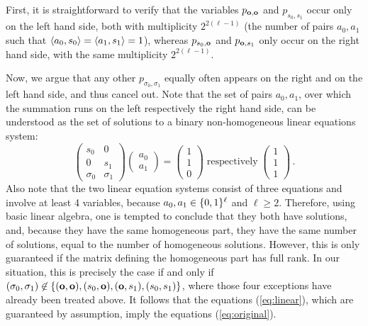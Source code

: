 First, it is straightforward to verify that the variables
$p_{\text{\boldmath${\bf o}$},\text{\boldmath${\bf o}$}}$ and $p_{s_0,s_1}$ occur only on the left hand side,
both with multiplicity $2^{2(\ell-1)}$ (the number of pairs $a_0,a_1$
such that $\langle a_0,s_0\rangle = \langle a_1,s_1\rangle = 1$), whereas $p_{s_0,\text{\boldmath${\bf o}$}}$
and $p_{\text{\boldmath${\bf o}$},s_1}$ only occur on the right hand side, with the same
multiplicity $2^{2(\ell-1)}$.

Now, we argue that any other $p_{\sigma_0,\sigma_1}$ equally often
appears on the right and on the left hand side, and thus cancel out.
Note that the set of pairs $a_0,a_1$, over which the summation runs on
the left respectively the right hand side, can be understood as the
set of solutions to a binary non-homogeneous linear equations system:
$$
\left(
\begin{array}{cc}
s_0 & 0 \\
0   & s_1 \\
\sigma_0 & \sigma_1 
\end{array}
\right)
\left(
\begin{array}{c}
a_0 \\ a_1
\end{array}
\right) 
=
\left(
\begin{array}{c}
1 \\ 1 \\ 0
\end{array}
\right)
\;\text{respectively}\;
\left(
\begin{array}{c}
1 \\ 1 \\ 1
\end{array}
\right)\, .
$$
Also note that the two linear equation systems consist of three
equations and involve at least 4 variables, because $a_0,a_1 \in
\{0,1\}^{\ell}$ and $\ell \geq 2$. Therefore, using basic linear
algebra, one is tempted to conclude that they both have solutions,
and, because they have the same homogeneous part, they have the same
number of solutions, equal to the number of homogeneous solutions.
However, this is only guaranteed if the matrix defining the
homogeneous part has full rank. In our situation, this is precisely the case if
and only if $(\sigma_0,\sigma_1) \not\in
\{(\text{\boldmath${\bf o}$},\text{\boldmath${\bf o}$}),(s_0,\text{\boldmath${\bf o}$}),(\text{\boldmath${\bf o}$},s_1),(s_0,s_1)\}$, where those
four exceptions have already been treated above. It follows that the
equations (\ref{eq:linear}), which are guaranteed by assumption, imply
the equations (\ref{eq:original}).
 
